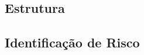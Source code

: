 \subsection{Estrutura} %
\label{sub:estruturaEstacao}



\subsection{Identificação de Risco} %
\label{sub:identifica_o_de_risco}


